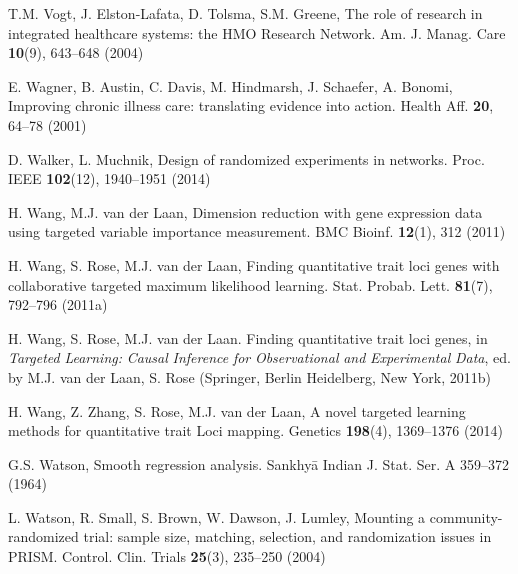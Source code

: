 \begin{list}{}{\setlength{\leftmargin}{2.1em}\setlength{\labelwidth}{0pt}
  \setlength{\labelsep}{0pt}\setlength{\itemindent}{-2.1em}
  \setlength{\parsep}{0pt}\setlength{\itemsep}{2pt}\setlength{\topsep}{0pt}}
\item\label{refentry:REF461}T.M. Vogt, J. Elston-Lafata, D. Tolsma, S.M. Greene, The role of research in integrated healthcare systems: the HMO Research Network. Am. J. Manag. Care \textbf{10}(9), 643--648 (2004)\label{refend:REF461}
\item\label{refentry:REF462}E. Wagner, B. Austin, C. Davis, M. Hindmarsh, J. Schaefer, A. Bonomi, Improving chronic illness care: translating evidence into action. Health Aff. \textbf{20}, 64--78 (2001)\label{refend:REF462}
\item\label{refentry:REF463}D. Walker, L. Muchnik, Design of randomized experiments in networks. Proc. IEEE \textbf{102}(12), 1940--1951 (2014)\label{refend:REF463}
\item\label{refentry:REF464}H. Wang, M.J. van der Laan, Dimension reduction with gene expression data using targeted variable importance measurement. BMC Bioinf. \textbf{12}(1), 312 (2011)\label{refend:REF464}
\item\label{refentry:REF465}H. Wang, S. Rose, M.J. van der Laan, Finding quantitative trait loci genes with collaborative targeted maximum likelihood learning. Stat. Probab. Lett. \textbf{81}(7), 792--796 (2011a)\label{refend:REF465}
\item\label{refentry:REF466}H. Wang, S. Rose, M.J. van der Laan. Finding quantitative trait loci genes, in \textit{Targeted} \textit{Learning:} \textit{Causal} \textit{Inference} \textit{for} \textit{Observational} \textit{and} \textit{Experimental} \textit{Data}, ed. by M.J. van der Laan, S. Rose (Springer, Berlin Heidelberg, New York, 2011b)\label{refend:REF466}
\item\label{refentry:REF467}H. Wang, Z. Zhang, S. Rose, M.J. van der Laan, A novel targeted learning methods for quantitative trait Loci mapping. Genetics \textbf{198}(4), 1369--1376 (2014)\label{refend:REF467}
\item\label{refentry:REF468}G.S. Watson, Smooth regression analysis. Sankhyā Indian J. Stat. Ser. A 359--372 (1964)\label{refend:REF468}
\item\label{refentry:REF469}L. Watson, R. Small, S. Brown, W. Dawson, J. Lumley, Mounting a community-randomized trial: sample size, matching, selection, and randomization issues in PRISM. Control. Clin. Trials \textbf{25}(3), 235--250 (2004)\label{refend:REF469}

\end{list}
